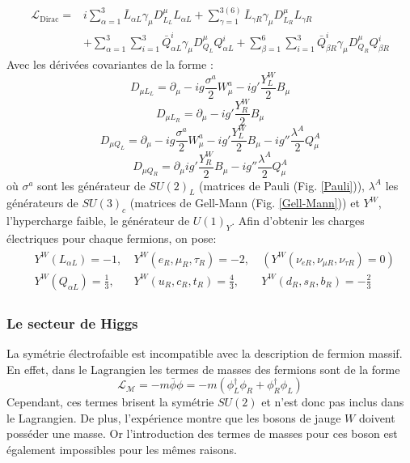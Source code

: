 \begin{equation}
\begin{split}
\mathcal{L}_{\mathrm{Dirac}}=&i\sum_{\alpha=1}^{3}\bar{L}_{\alpha L}\gamma_{\mu}D_{L_{L}}^{\mu}L_{\alpha L}+\sum_{\gamma=1}^{3(6)}\bar{L}_{\gamma R}\gamma_{\mu}D_{L_{R}}^{\mu}L_{\gamma R}\\
&+\sum_{\alpha=1}^{3}\sum_{i=1}^{3}\bar{Q}_{\alpha L}^{i}\gamma_{\mu}D_{Q_{L}}^{\mu}Q_{\alpha L}^{i}+\sum_{\beta=1}^{6}\sum_{i=1}^{3}\bar{Q}_{\beta R}^{i}\gamma_{\mu}D_{Q_{R}}^{\mu}Q_{\beta R}^{i}
\end{split}
\end{equation}
Avec les dérivées covariantes de la forme : 
\begin{equation}
D_{\mu L_{L}}=\partial_{\mu} -ig\frac{\sigma^a}{2}W_{\mu}^{a}-ig'\frac{Y^{W}_{L}}{2}B_{\mu}
\end{equation}
\begin{equation}
D_{\mu L_{R}}=\partial_{\mu} -ig'\frac{Y^{W}_{R}}{2}B_{\mu}
\end{equation}
\begin{equation}
D_{\mu Q_{L}}=\partial_{\mu} -ig\frac{\sigma^a}{2}W_{\mu}^{a}-ig'\frac{Y^{W}_{L}}{2}B_{\mu}-ig''\frac{\lambda^{A}}{2}Q_{\mu}^{A}
\end{equation}
\begin{equation}
D_{\mu Q_{R}}=\partial_{\mu}ig'\frac{Y^{W}_{R}}{2}B_{\mu}-ig''\frac{\lambda^{A}}{2}Q_{\mu}^{A}
\end{equation}
où $\sigma^{a}$ sont les générateur de $SU(2)_{L}$ (matrices de Pauli (Fig. \ref{Pauli})), $\lambda^{A}$ les générateurs de $SU(3)_{c}$ (matrices de Gell-Mann (Fig. \ref{Gell-Mann})) et $Y^{W}$, l'hypercharge faible, le générateur de $U(1)_{Y}$. 
Afin d'obtenir les charges électriques pour chaque fermions, on pose:
\begin{multline}
\begin{split}
&Y^W(L_{\alpha L})=-1,\ &Y^W(e_{R},\mu_{R},\tau_{R})=-2,\ &\left(Y^W(\nu_{e R},\nu_{\mu R},\nu_{\tau R})=0\right)\\
&Y^W(Q_{\alpha L})=\frac{1}{3},\ &Y^W(u_{R},c_{R},t_{R})=\frac{4}{3},\ &Y^W(d_{R},s_{R},b_{R})=-\frac{2}{3}
\end{split}
\end{multline}  

\subsubsection{Le secteur de Higgs} 
La symétrie électrofaible est incompatible avec la description de fermion massif. En effet, dans le Lagrangien les termes de masses des fermions sont de la forme 
\begin{equation}
\mathcal{L_{M}}=-m\bar{\phi}\phi=-m \left(\phi_{L}^{\dagger}\phi_{R}+\phi_{R}^{\dagger}\phi_{L}\right)
\end{equation}
Cependant, ces termes brisent la symétrie $SU(2)$ et n'est donc pas inclus dans le Lagrangien. De plus, l'expérience montre que les bosons de jauge $W$ doivent posséder une masse. Or l'introduction des termes de masses pour ces boson est également impossibles pour les mêmes raisons.

